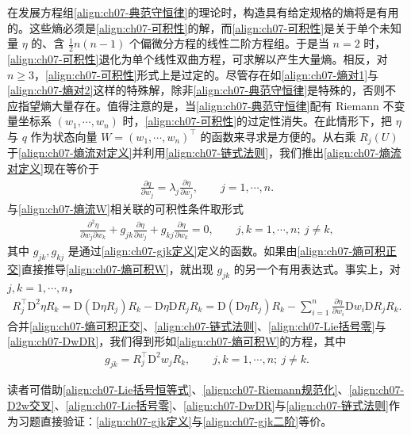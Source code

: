 \documentclass[../../main.tex]{subfiles}
\begin{document}
在发展方程组\eqref{align:ch07-典范守恒律}的理论时，构造具有给定规格的熵将是有用的。这些熵必须是\eqref{align:ch07-可积性}的解，而\eqref{align:ch07-可积性}是关于单个未知量 $\eta$ 的、含 $\frac12 n(n-1)$ 个偏微分方程的线性二阶方程组。于是当 $n=2$ 时，\eqref{align:ch07-可积性}退化为单个线性双曲方程，可求解以产生大量熵。相反，对 $n\geqslant 3$，\eqref{align:ch07-可积性}形式上是过定的。尽管存在如\eqref{align:ch07-熵对1}与\eqref{align:ch07-熵对2}这样的特殊解，除非\eqref{align:ch07-典范守恒律}是特殊的，否则不应指望熵大量存在。值得注意的是，当\eqref{align:ch07-典范守恒律}配有 Riemann 不变量坐标系 $(w_1,\cdots,w_n)$ 时，\eqref{align:ch07-可积性}的过定性消失。在此情形下，把 $\eta$ 与 $q$ 作为状态向量 $W=(w_1,\cdots,w_n)^\top$ 的函数来寻求是方便的。从右乘 $R_j(U)$ 于\eqref{align:ch07-熵流对定义}并利用\eqref{align:ch07-链式法则}，我们推出\eqref{align:ch07-熵流对定义}现在等价于
\begin{align}
\frac{\partial q}{\partial w_j}=\lambda_j\frac{\partial\eta}{\partial w_j},\qquad j=1,\cdots,n.
\label{align:ch07-熵流W}
\end{align}
与\eqref{align:ch07-熵流W}相关联的可积性条件取形式
\begin{align}
\frac{\partial^2\eta}{\partial w_j\partial w_k}+g_{jk}\frac{\partial\eta}{\partial w_j}+g_{kj}\frac{\partial\eta}{\partial w_k}=0,\qquad j,k=1,\cdots,n;\ j\neq k,
\label{align:ch07-熵可积W}
\end{align}
其中 $g_{jk},g_{kj}$ 是通过\eqref{align:ch07-gjk定义}定义的函数。如果由\eqref{align:ch07-熵可积正交}直接推导\eqref{align:ch07-熵可积W}，就出现 $g_{jk}$ 的另一个有用表达式。事实上，对 $j,k=1,\cdots,n$，
\begin{align}
R_j^\top\mathrm{D}^2\eta R_k=\mathrm{D}(\mathrm{D}\eta R_j)R_k-\mathrm{D}\eta\mathrm{D}R_j R_k
=\mathrm{D}(\mathrm{D}\eta R_j)R_k-\sum_{i=1}^n\frac{\partial\eta}{\partial w_i}\mathrm{D}w_i\mathrm{D}R_j R_k.
\label{align:ch07-D2eta展开}
\end{align}
合并\eqref{align:ch07-熵可积正交}、\eqref{align:ch07-链式法则}、\eqref{align:ch07-Lie括号零}与\eqref{align:ch07-DwDR}，我们得到形如\eqref{align:ch07-熵可积W}的方程，其中
\begin{align}
g_{jk}=R_j^\top\mathrm{D}^2 w_j R_k,\qquad j,k=1,\cdots,n;\ j\neq k.
\label{align:ch07-gjk二阶}
\end{align}

读者可借助\eqref{align:ch07-Lie括号恒等式}、\eqref{align:ch07-Riemann规范化}、\eqref{align:ch07-D2w交叉}、\eqref{align:ch07-Lie括号零}、\eqref{align:ch07-DwDR}与\eqref{align:ch07-链式法则}作为习题直接验证：\eqref{align:ch07-gjk定义}与\eqref{align:ch07-gjk二阶}等价。
\end{document}
